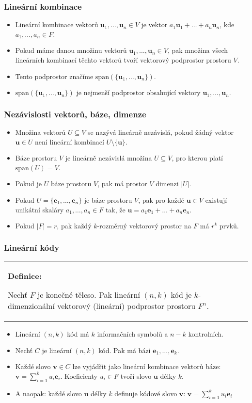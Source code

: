\documentclass{beamer}
\newenvironment{definice}
{
    \begin{center}
    \begin{tabular}{p{9cm}}
    \textbf{Definice:}
}
{
    \end{tabular}
    \end{center}
}
\newcommand{\vu}{\textbf{u}}
\newcommand{\vv}{\textbf{v}}
\newcommand{\e}{\textbf{e}}
\renewcommand{\span}{\mbox{span}}
\newenvironment{itemizex}%
  {\large \begin{itemize}%
    \setlength{\itemsep}{8pt}%
    \setlength{\parskip}{8pt}}%
  {\end{itemize}}
\newenvironment{itemizey}%
  {\large \begin{itemize}%
    \setlength{\itemsep}{6pt}%
    \setlength{\parskip}{6pt}}%
  {\end{itemize}}
\begin{document}
\begin{frame}[t,fragile]\frametitle{Lineární kombinace} 
    \begin{itemizex}
        \item Lineární kombinace vektorů $\vu_1, \dots, \vu_n\in V$ je vektor $a_1\vu_1+\dots+a_n\vu_n$, kde $a_1,\dots,a_n\in F$.
        \item Pokud máme danou množinu vektorů $\vu_1, \dots, \vu_n\in V$, pak množina všech lineárních kombinací těchto vektorů tvoří vektorový podprostor prostoru $V$.
        \item Tento podprostor značíme $\span(\{\vu_1, \dots, \vu_n\})$.
        \item $\span(\{\vu_1, \dots, \vu_n\})$ je nejmenší podprostor obsahující vektory $\vu_1, \dots, \vu_n$.
    \end{itemizex}
\end{frame}



\begin{frame}[t,fragile]\frametitle{Nezávislosti vektorů, báze, dimenze} 
    \begin{itemizey}
        \item Množina vektorů $U\subseteq V$ se nazývá lineárně nezávislá, pokud žádný vektor $\vu\in U$ není lineární kombinací $U\setminus\{\vu\}$.
        \item Báze prostoru $V$ je lineárně nezávislá množina $U\subseteq V$, pro kterou platí $\span(U)=V$.
        \item Pokud je $U$ báze prostoru $V$, pak má prostor $V$ dimenzi $|U|$.
        \item Pokud $U=\{\e_1,\dots,\e_n\}$ je báze prostoru $V$, pak pro každé $\vu\in V$ existují unikátní skaláry $a_1,\dots,a_n\in F$ tak, že $\vu=a_1\e_1+\dots+a_n\e_n$.
        \item Pokud $|F|=r$, pak každý $k$-rozměrný vektorový prostor na $F$ má $r^k$ prvků.
    \end{itemizey}
\end{frame}


\begin{frame}[t,fragile]\frametitle{Lineární kódy} 
    \begin{definice}
        Nechť $F$ je konečné těleso. Pak lineární $(n,k)$ kód je $k$-dimenzionální vektorový (lineární) podprostor prostoru $F^n$. 
    \end{definice}

    \begin{itemizex}
        \item Lineární $(n,k)$ kód má $k$ informačních symbolů a $n-k$ kontrolních.
        \item Nechť $C$ je lineární $(n,k)$ kód. Pak má bázi $\e_1,\dots,\e_k$.
        \item Každé slovo $\vv\in C$ lze vyjádřit jako lineární kombinace vektorů báze: $\vv=\sum_{i=1}^k u_i\e_i$. Koeficienty $u_i\in F$ tvoří slovo $\vu$ délky $k$.
        \item A naopak: každé slovo $\vu$ délky $k$ definuje kódové slovo $\vv$: $\vv=\sum_{i=1}^ku_i\e_i$
    \end{itemizex}
\end{frame}
\end{document}
